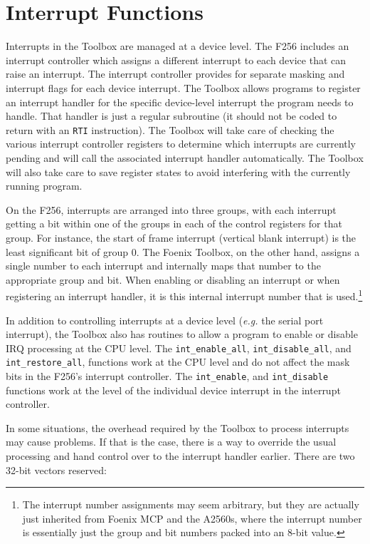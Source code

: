 \section{Interrupt Functions}
Interrupts in the Toolbox are managed at a device level.
The F256 includes an interrupt controller which assigns a different interrupt to each device that can raise an interrupt.
The interrupt controller provides for separate masking and interrupt flags for each device interrupt.
The Toolbox allows programs to register an interrupt handler for the specific device-level interrupt the program needs to handle.
That handler is just a regular subroutine (it should not be coded to return with an \verb+RTI+ instruction).
The Toolbox will take care of checking the various interrupt controller registers to determine which interrupts are currently pending
and will call the associated interrupt handler automatically. The Toolbox will also take care to save register states to avoid interfering
with the currently running program.

On the F256, interrupts are arranged into three groups, with each interrupt getting a bit within one of the groups in each of the 
control registers for that group. For instance, the start of frame interrupt (vertical blank interrupt) is the least significant bit of group 0.
The Foenix Toolbox, on the other hand, assigns a single number to each interrupt and internally maps that number to the appropriate group and bit.
When enabling or disabling an interrupt or when registering an interrupt handler, it is this internal interrupt number that is used.\footnote{The interrupt
number assignments may seem arbitrary, but they are actually just inherited from Foenix MCP and the A2560s, where the interrupt number is essentially just
the group and bit numbers packed into an 8-bit value.}

In addition to controlling interrupts at a device level ({\it e.g.} the serial port interrupt), the Toolbox also has routines to allow a program to
enable or disable IRQ processing at the CPU level. The \lstinline!int_enable_all!, \lstinline!int_disable_all!, and \lstinline!int_restore_all!,
functions work at the CPU level and do not affect the mask bits in the F256's interrupt controller. The \lstinline!int_enable!, and \lstinline!int_disable!
functions work at the level of the individual device interrupt in the interrupt controller.

In some situations, the overhead required by the Toolbox to process interrupts may cause problems.
If that is the case, there is a way to override the usual processing and hand control over to the interrupt handler earlier.
There are two 32-bit vectors reserved:

